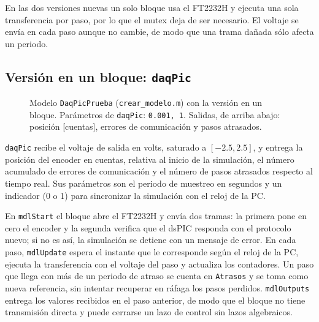 \documentclass[11pt]{article}
\newcommand{\simmarco}[4]{%
  \fill[black!30] ({#1+2},{#2+2}) rectangle ({#3+2},{#4+2});
  \draw[simblk] (#1,#2) rectangle (#3,#4);}
\newcommand{\simnombre}[4]{\node[simname] at ({(#1+#3)/2},{#4+2}) {#2};}
\newcommand{\simsfun}[5]{%
  \simmarco{#1}{#2}{#3}{#4}
  \node[font=\scriptsize\ttfamily] at ({(#1+#3)/2},{(#2+#4)/2}) {#5};
  \simnombre{#1}{#5}{#3}{#4}}
\newcommand{\simseno}[5]{%
  \simmarco{#1}{#2}{#3}{#4}
  \draw[semithick, shift={({(#1+#3)/2},{(#2+#4)/2})}]
    plot[domain=-18:18, samples=37, smooth] (\x, {-9*sin(10*\x)});
  \simnombre{#1}{#5}{#3}{#4}}
\newcommand{\simscope}[5]{%
  \simmarco{#1}{#2}{#3}{#4}
  \draw[fill=black!10] ({#1+6},{#2+8}) rectangle ({#3-6},{#2+36});
  \draw[shift={({(#1+#3)/2},{#2+22})}]
    plot[domain=-12:12, samples=25, smooth] (\x, {-8*sin(15*\x)});
  \foreach \k in {-8,0,8} \draw ({(#1+#3)/2+\k},{#4-12}) circle (2.5);
  \simnombre{#1}{#5}{#3}{#4}}
\newcommand{\simdisplay}[5]{%
  \simmarco{#1}{#2}{#3}{#4}
  \node[font=\scriptsize\ttfamily, anchor=east, inner sep=0pt]
    at ({#3-6},{(#2+#4)/2}) {0};
  \simnombre{#1}{#5}{#3}{#4}}
\newcommand{\code}[1]{\texttt{#1}}
\begin{document}
En las dos versiones nuevas un solo bloque usa el FT2232H y ejecuta una sola
transferencia por paso, por lo que el mutex deja de ser necesario. El voltaje
se envía en cada paso aunque no cambie, de modo que una trama dañada sólo
afecta un periodo.

\subsection{Versión en un bloque: \code{daqPic}}

\begin{figure}[H]
\centering
{}
\caption{Modelo \code{DaqPicPrueba} (\code{crear\_modelo.m}) con la versión
en un bloque. Parámetros de \code{daqPic}: \code{0.001, 1}. Salidas, de
arriba abajo: posición [cuentas], errores de comunicación y pasos
atrasados.}
\label{fig:sim-uno}
\end{figure}

\code{daqPic} recibe el voltaje de salida en volts, saturado a
$[-2.5, 2.5]$, y entrega la posición del encoder en cuentas, relativa al
inicio de la simulación, el número acumulado de errores de comunicación y el
número de pasos atrasados respecto al tiempo real. Sus parámetros son el
periodo de muestreo en segundos y un indicador (0 o 1) para sincronizar la
simulación con el reloj de la PC.

En \code{mdlStart} el bloque abre el FT2232H y envía dos tramas: la primera
pone en cero el encoder y la segunda verifica que el dsPIC responda con el
protocolo nuevo; si no es así, la simulación se detiene con un mensaje de
error. En cada paso, \code{mdlUpdate} espera el instante que le corresponde
según el reloj de la PC, ejecuta la transferencia con el voltaje del paso y
actualiza los contadores. Un paso que llega con más de un periodo de atraso
se cuenta en \code{Atrasos} y se toma como nueva referencia, sin intentar
recuperar en ráfaga los pasos perdidos. \code{mdlOutputs} entrega los
valores recibidos en el paso anterior, de modo que el bloque no tiene
transmisión directa y puede cerrarse un lazo de control sin lazos
algebraicos.
\end{document}

